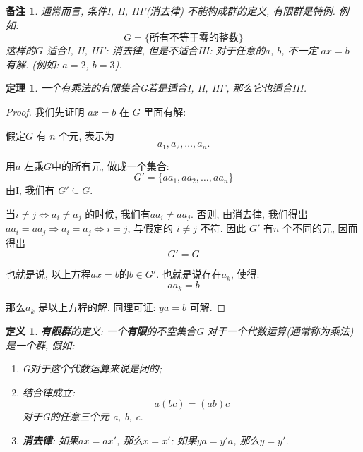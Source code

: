 \documentclass[utf8]{ctexbook}
\newtheorem{theorem}{定理}[section]
\newtheorem{definition}{定义}[section]
\newtheorem{memo}{备注}[section]
\begin{document}
\begin{memo}
通常而言, 条件I, II, III'(消去律) 不能构成群的定义, 有限群是特例. 例如: 
\begin{equation}
G = \{ \mbox{所有不等于零的整数} \}
\end{equation}
这样的$G$ 适合I, II, III': 消去律, 但是不适合III: 对于任意的$a$, $b$, 不一定 $ax=b$ 有解. (例如: $a=2$, $b=3$).

\end{memo}

\begin{theorem}
一个有乘法的有限集合G若是适合I, II, III', 那么它也适合III.
\end{theorem}

\begin{proof}
我们先证明 $ax = b$ 在 $G$ 里面有解:

假定$G$ 有 $n$ 个元, 表示为
\begin{equation}
a_1, a_2, \ldots, a_n .
\end{equation}

用$a$ 左乘$G$中的所有元, 做成一个集合:
\begin{equation}
G' = \{ a a_1, a a_2, \ldots, a a_n \}
\end{equation}
由I, 我们有 $G' \subseteq G$.

当$i \neq j \iff a_i \neq a_j$ 的时候, 我们有$a a_i \neq a a_j$. 否则, 由消去律, 我们得出$a a_i = a a_j \Rightarrow a_i = a_j \iff i = j$, 与假定的 $i \neq j $ 不符. 因此 $G'$ 有$n$ 个不同的元, 因而得出
\begin{equation}
G' = G
\end{equation}

也就是说, 以上方程$ax=b$的$b \in G'$. 也就是说存在$a_k$, 使得:
\begin{equation}
a a_k = b
\end{equation}

那么$a_k$ 是以上方程的解.  同理可证: $ya = b$ 可解. 
\end{proof}

\begin{definition}\label{def_finite_group}
\textbf{有限群}的定义: 一个\textbf{有限}的不空集合G 对于一个代数运算(通常称为乘法)是一个群, 假如:
\begin{enumerate}
\item[I.]{G对于这个代数运算来说是闭的;}
\item[II.]{结合律成立:
	\begin{equation}
		a(bc) = (ab) c 	
	\end{equation}
对于G的任意三个元 a, b, c.}
\item[III']{\textbf{消去律}: 如果$ax = a x'$, 那么$x = x'$; 如果$ya = y' a $, 那么$y = y'$.}
\end{enumerate}
\end{definition}
\end{document}

